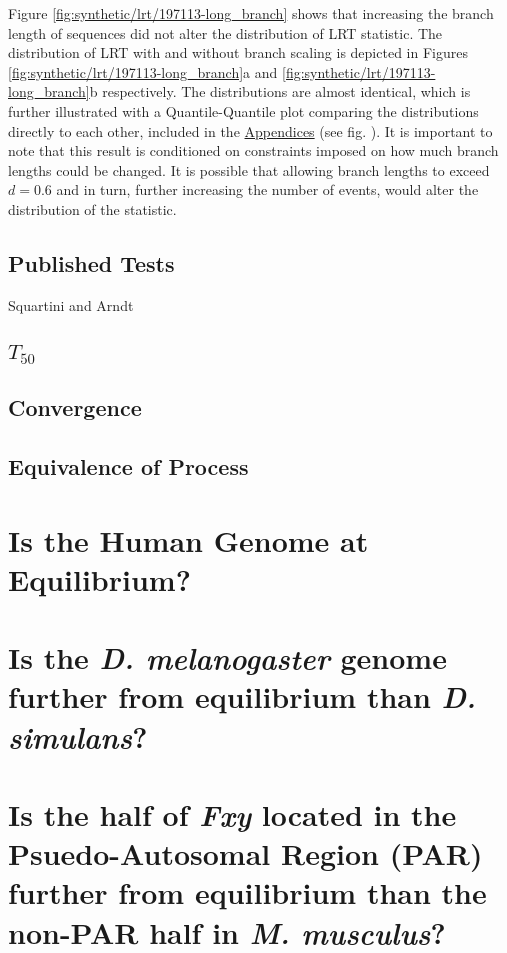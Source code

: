 

Figure \ref{fig:synthetic/lrt/197113-long_branch} shows that increasing the branch length of sequences did not alter the distribution of LRT statistic. The distribution of LRT with and without branch scaling is depicted in Figures \ref{fig:synthetic/lrt/197113-long_branch}a and \ref{fig:synthetic/lrt/197113-long_branch}b respectively. The distributions are almost identical, which is further illustrated with a Quantile-Quantile plot comparing the distributions directly to each other, included in the \hyperref[Appendices]{Appendices} (see fig. ). It is important to note that this result is conditioned on constraints imposed on how much branch lengths could be changed. It is possible that allowing branch lengths to exceed $d=0.6$ and in turn, further increasing the number of events, would alter the distribution of the statistic.




\subsection{Published Tests}
Squartini and Arndt 




\subsection{$T_{50}$}





\subsection{Convergence}



\subsection{Equivalence of Process}

\section{Is the Human Genome at Equilibrium?}

\section{Is the \textit{D. melanogaster} genome further from equilibrium than \textit{D. simulans}?}

\section{Is the half of \textit{Fxy} located in the Psuedo-Autosomal Region (PAR) further from equilibrium than the non-PAR half in \textit{M. musculus}?}